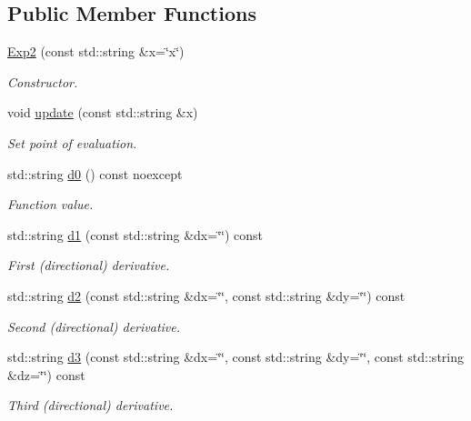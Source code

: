 \subsection*{Public Member Functions}
\begin{DoxyCompactItemize}
\item 
\hyperlink{structFunG_1_1stringify_1_1Exp2_a3935614d422b00874baf3f5f216acbf2}{Exp2} (const std\-::string \&x=\char`\"{}x\char`\"{})
\begin{DoxyCompactList}\small\item\em Constructor. \end{DoxyCompactList}\item 
void \hyperlink{structFunG_1_1stringify_1_1Exp2_a4e482ca37305882c664bbc92e1348542}{update} (const std\-::string \&x)
\begin{DoxyCompactList}\small\item\em Set point of evaluation. \end{DoxyCompactList}\item 
std\-::string \hyperlink{structFunG_1_1stringify_1_1Exp2_a70056916ba98c5ea3279ad0695b83f93}{d0} () const noexcept
\begin{DoxyCompactList}\small\item\em Function value. \end{DoxyCompactList}\item 
std\-::string \hyperlink{structFunG_1_1stringify_1_1Exp2_acb06b45c92be930c03b5538a27c8363b}{d1} (const std\-::string \&dx=\char`\"{}\char`\"{}) const 
\begin{DoxyCompactList}\small\item\em First (directional) derivative. \end{DoxyCompactList}\item 
std\-::string \hyperlink{structFunG_1_1stringify_1_1Exp2_ac0eec008f0b04a79a88d54f589cdd4ed}{d2} (const std\-::string \&dx=\char`\"{}\char`\"{}, const std\-::string \&dy=\char`\"{}\char`\"{}) const 
\begin{DoxyCompactList}\small\item\em Second (directional) derivative. \end{DoxyCompactList}\item 
std\-::string \hyperlink{structFunG_1_1stringify_1_1Exp2_ad05f0cea0cecb9002f07a1a41fc8d1a3}{d3} (const std\-::string \&dx=\char`\"{}\char`\"{}, const std\-::string \&dy=\char`\"{}\char`\"{}, const std\-::string \&dz=\char`\"{}\char`\"{}) const 
\begin{DoxyCompactList}\small\item\em Third (directional) derivative. \end{DoxyCompactList}\end{DoxyCompactItemize}


